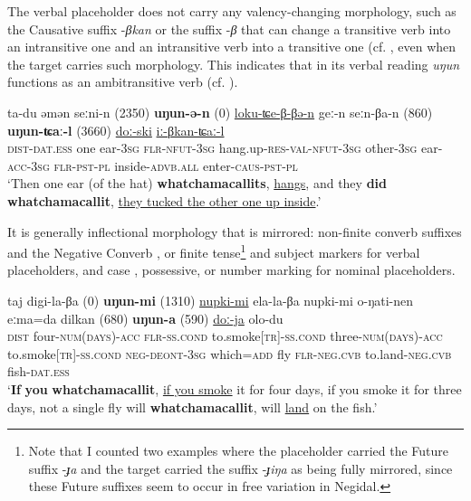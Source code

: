 \documentclass[output=paper]{langscibook}
\begin{document}
The verbal placeholder does not carry any valency-changing morphology, such as the Causative suffix -\textit{βkan} or the suffix -\textit{β} that can change a transitive verb into an intransitive one  and an intransitive verb into a transitive one (cf. \citealt[29--31)]{AralovaPakendorf2022}, even when the target carries such morphology. This indicates that in its verbal reading \textit{uŋun} functions as an ambitransitive verb (cf. ).


\ea \label{ex:pakendorf:14}
\gll ta-du
	əmən
	seːni-n
	\textup{(2350)}
	\textbf{uŋun-ə-n}
	\textup{(0)}
	\uline{loku-ʨe-β-βə-n}
	geː-n
	seːn-βa-n
	\textup{(860)}
	\textbf{uŋun-ʨaː-l}
	\textup{(3660)}
	\uline{doː-ski}
	\uline{iː-βkan-ʨaː-l}\\
    \textsc{dist-dat.ess}
    one
    ear-\textsc{3sg}
    {}
    \textsc{flr-nfut-3sg}
    {}
    hang.up-\textsc{res-val-nfut}-\textsc{3sg}
    other-\textsc{3sg}
    ear-\textsc{acc-3sg}
    {}
    \textsc{flr-pst-pl}
    {}
    inside-\textsc{advb.all}
    enter-\textsc{caus-pst-pl}\\
\glt ‘Then one ear (of the hat) \textbf{whatchamacallits}, \uline{hangs}, and they \textbf{did} \textbf{whatchamacallit}, \uline{they tucked the other one up inside}.’ 
\z

It is generally inflectional morphology that is mirrored: non-finite converb suffixes and the Negative Converb , or finite tense\footnote{Note that I counted two examples where the placeholder carried the Future suffix -\textit{ɟa} and the target carried the suffix -\textit{ɟiŋa} as being fully mirrored, since these Future suffixes seem to occur in free variation in Negidal.} and subject markers for verbal placeholders, and case , possessive, or number marking for nominal placeholders. 


\ea \label{ex:pakendorf:15}
\gll taj
	digi-la-βa
	\textup{(0)}
	\textbf{uŋun-mi}
	\textup{(1310)}
	\uline{nupki-mi}
	ela-la-βa
	nupki-mi
	o-ŋati-nen
	eːma=da
	dilkan
	\textup{(680)}
	\textbf{uŋun-a}
	\textup{(590)}
	\uline{doː-ja}
	olo-du\\
     \textsc{dist}
     four-\textsc{num(days)-acc}
     {}
     \textsc{flr-ss.cond}
     {}
     to.smoke[\textsc{tr}]-\textsc{ss.cond}
     three-\textsc{num(days)-acc}
     to.smoke[\textsc{tr}]-\textsc{ss.cond}
     \textsc{neg-deont}-\textsc{3sg}
     which=\textsc{add}
     fly
     {}
     \textsc{flr-neg.cvb}
     {}
     to.land-\textsc{neg.cvb}
     fish-\textsc{dat.ess}\\
\glt ‘\textbf{If} \textbf{you} \textbf{whatchamacallit}, \uline{if you smoke} it for four days, if you smoke it for three days, not a single fly will \textbf{whatchamacallit}, will \uline{land} on the fish.’ 
\z
\end{document}
